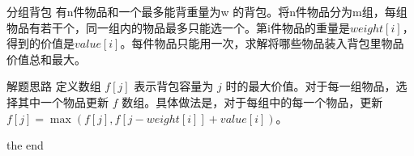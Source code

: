 \documentclass{beamer}
\begin{document}
\begin{frame}{分组背包}
    有n件物品和一个最多能背重量为w 的背包。将n件物品分为m组，每组物品有若干个，同一组内的物品最多只能选一个。第i件物品的重量是$weight[i]$，得到的价值是$value[i]$。每件物品只能用一次，求解将哪些物品装入背包里物品价值总和最大。
\end{frame}

\begin{frame}{解题思路}
    定义数组 $f[j]$ 表示背包容量为 $j$ 时的最大价值。对于每一组物品，选择其中一个物品更新 $f$ 数组。具体做法是，对于每组中的每一个物品，更新 $f[j] = \max(f[j], f[j - weight[i]] + value[i])$。
\end{frame}

\begin{frame}{}
    \centering
    \Huge the end
\end{frame}
\end{document}
